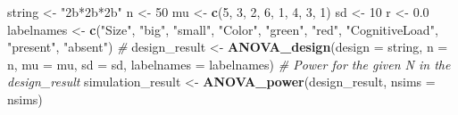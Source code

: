 \documentclass[]{book}
\newenvironment{Shaded}{\begin{snugshade}}{\end{snugshade}}
\newcommand{\CommentTok}[1]{\textcolor[rgb]{0.56,0.35,0.01}{\textit{#1}}}
\newcommand{\DataTypeTok}[1]{\textcolor[rgb]{0.13,0.29,0.53}{#1}}
\newcommand{\DecValTok}[1]{\textcolor[rgb]{0.00,0.00,0.81}{#1}}
\newcommand{\FloatTok}[1]{\textcolor[rgb]{0.00,0.00,0.81}{#1}}
\newcommand{\KeywordTok}[1]{\textcolor[rgb]{0.13,0.29,0.53}{\textbf{#1}}}
\newcommand{\NormalTok}[1]{#1}
\newcommand{\StringTok}[1]{\textcolor[rgb]{0.31,0.60,0.02}{#1}}
\begin{document}
\begin{Shaded}
\begin{Highlighting}[]
\NormalTok{string <-}\StringTok{ "2b*2b*2b"}
\NormalTok{n <-}\StringTok{ }\DecValTok{50}
\NormalTok{mu <-}\StringTok{ }\KeywordTok{c}\NormalTok{(}\DecValTok{5}\NormalTok{, }\DecValTok{3}\NormalTok{, }\DecValTok{2}\NormalTok{, }\DecValTok{6}\NormalTok{, }\DecValTok{1}\NormalTok{, }\DecValTok{4}\NormalTok{, }\DecValTok{3}\NormalTok{, }\DecValTok{1}\NormalTok{) }
\NormalTok{sd <-}\StringTok{ }\DecValTok{10}
\NormalTok{r <-}\StringTok{ }\FloatTok{0.0}
\NormalTok{labelnames <-}\StringTok{ }\KeywordTok{c}\NormalTok{(}\StringTok{"Size"}\NormalTok{, }\StringTok{"big"}\NormalTok{, }\StringTok{"small"}\NormalTok{, }\StringTok{"Color"}\NormalTok{, }\StringTok{"green"}\NormalTok{, }\StringTok{"red"}\NormalTok{, }
                \StringTok{"CognitiveLoad"}\NormalTok{, }\StringTok{"present"}\NormalTok{, }\StringTok{"absent"}\NormalTok{) }\CommentTok{#}
\NormalTok{design_result <-}\StringTok{ }\KeywordTok{ANOVA_design}\NormalTok{(}\DataTypeTok{design =}\NormalTok{ string,}
                   \DataTypeTok{n =}\NormalTok{ n, }
                   \DataTypeTok{mu =}\NormalTok{ mu, }
                   \DataTypeTok{sd =}\NormalTok{ sd, }
                   \DataTypeTok{labelnames =}\NormalTok{ labelnames)}
\CommentTok{# Power for the given N in the design_result}
\NormalTok{simulation_result <-}\StringTok{ }\KeywordTok{ANOVA_power}\NormalTok{(design_result, }\DataTypeTok{nsims =}\NormalTok{ nsims)}
\end{Highlighting}
\end{Shaded}
\end{document}
